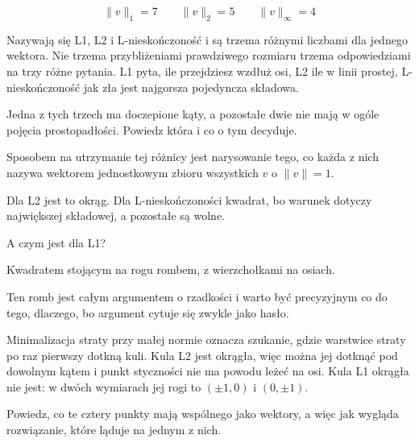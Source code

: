 \begin{fr}
\begin{ansblock}
\[ \lVert v \rVert_1 = 7 \qquad \lVert v \rVert_2 = 5 \qquad
   \lVert v \rVert_\infty = 4 \]
\end{ansblock}

Nazywają się L1, L2 i L-nieskończoność i są trzema różnymi liczbami dla jednego
wektora. Nie trzema przybliżeniami prawdziwego rozmiaru \dash{} trzema
odpowiedziami na trzy różne pytania. L1 pyta, ile przejdziesz wzdłuż osi, L2
ile w linii prostej, L-nieskończoność jak zła jest najgorsza pojedyncza
składowa.

Jedna z tych trzech ma doczepione kąty, a pozostałe dwie nie mają w ogóle
pojęcia prostopadłości. Powiedz która i co o tym decyduje.
\dotline
\nextframe
\end{fr}

\begin{fr}
Sposobem na utrzymanie tej różnicy jest narysowanie tego, co każda z nich
nazywa wektorem jednostkowym \dash{} zbioru wszystkich $v$ o
$\lVert v \rVert = 1$.

Dla L2 jest to okrąg. Dla L-nieskończoności kwadrat, bo warunek dotyczy
największej składowej, a pozostałe są wolne.

A czym jest dla L1?
\nextframe
\end{fr}

\begin{fr}
\begin{ansblock}
Kwadratem stojącym na rogu \dash{} rombem, z wierzchołkami na osiach.
\end{ansblock}

Ten romb jest całym argumentem o rzadkości i warto być precyzyjnym co do tego,
dlaczego, bo argument cytuje się zwykle jako hasło.

Minimalizacja straty przy małej normie oznacza szukanie, gdzie warstwice straty
po raz pierwszy dotkną kuli. Kula L2 jest okrągła, więc można jej dotknąć pod
dowolnym kątem i punkt styczności nie ma powodu leżeć na osi. Kula L1 okrągła
nie jest: w dwóch wymiarach jej rogi to $(\pm 1, 0)$ i $(0, \pm 1)$.

Powiedz, co te cztery punkty mają wspólnego jako wektory, a więc jak wygląda
rozwiązanie, które ląduje na jednym z nich.
\dotline
\nextframe
\end{fr}

